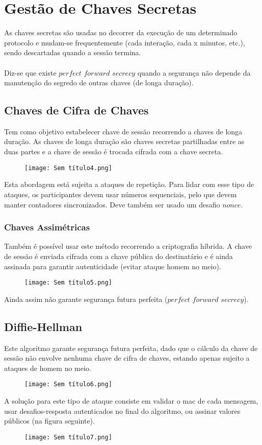 \documentclass[10pt,a4paper]{report}
\begin{document}
\section{Gestão de Chaves Secretas}
As chaves secretas são usadas no decorrer da execução de um determinado protocolo e mudam-se frequentemente (cada interação, cada x minutos, etc.), sendo descartadas quando a sessão termina.\\
\\
Diz-se que existe $perfect$ $forward$ $secrecy$ quando a segurança não depende da manutenção do segredo de outras chaves (de longa duração).
\subsection{Chaves de Cifra de Chaves}
Tem como objetivo estabelecer chave de sessão recorrendo a chaves de longa duração. As chaves de longa duração são chaves secretas partilhadas entre as duas partes e a chave de sessão é trocada cifrada com a chave secreta.
\begin{figure}[H]
\centering
\texttt{[image: Sem título4.png]}
\end{figure}
Esta abordagem está sujeita a ataques de repetição. Para lidar com esse tipo de ataques, os participantes devem usar números sequenciais, pelo que devem manter contadores sincronizados. Deve também ser usado um desafio $nonce$.
\subsubsection{Chaves Assimétricas}
Também é possível usar este método recorrendo a criptografia híbrida. A chave de sessão é enviada cifrada com a chave pública do destinatário e é ainda assinada para garantir autenticidade (evitar ataque homem no meio).
\begin{figure}[H]
\centering
\texttt{[image: Sem título5.png]}
\end{figure}
Ainda assim não garante segurança futura perfeita ($perfect$ $forward$ $secrecy$).
\subsection{Diffie-Hellman}
Este algoritmo garante segurança futura perfeita, dado que o cálculo da chave de sessão não envolve nenhuma chave de cifra de chaves, estando apenas sujeito a ataques de homem no meio.
\begin{figure}[H]
\centering
\texttt{[image: Sem título6.png]}
\end{figure}
A solução para este tipo de ataque consiste em validar o mac de cada mensagem, usar desafios-resposta autenticados no final do algoritmo, ou assinar valores públicos (na figura seguinte).
\begin{figure}[H]
\centering
\texttt{[image: Sem título7.png]}
\end{figure}
\end{document}
